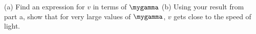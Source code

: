 (a) Find an expression for $v$ in terms of $\mygamma$\hwendpart\answercheck
(b) Using your result from part a, show that for very large values of $\mygamma$, $v$ gets
close to the speed of light.
